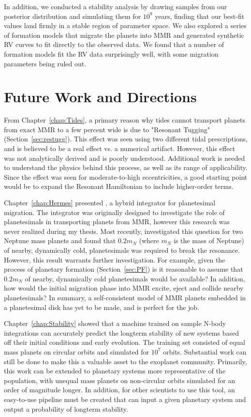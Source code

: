 In addition, we conducted a stability analysis by drawing samples from our posterior distribution and simulating them for $10^9$ years, finding that our best-fit values land firmly in a stable region of parameter space.
We also explored a series of formation models that migrate the planets into MMR and generated synthetic RV curves to fit directly to the observed data. 
We found that a number of formation models fit the RV data surprisingly well, with some migration parameters being ruled out.

\section{Future Work and Directions}
From Chapter~\ref{chap:Tides}, a primary reason why tides cannot transport planets from exact MMR to a few percent wide is due to "Resonant Tugging" (Section~\ref{sec:restugg}).
This effect was seen using two different tidal prescriptions, and is believed to be a real effect vs. a numerical artifact. 
However, this effect was not analytically derived and is poorly understood. 
Additional work is needed to understand the physics behind this process, as well as its range of applicability.
Since the effect was seen for moderate-to-high eccentricities, a good starting point would be to expand the Resonant Hamiltonian to include higher-order terms. 

Chapter~\ref{chap:Hermes} presented \hermes, a hybrid integrator for planetesimal migration. 
The integrator was originally designed to investigate the role of planetesimals in transporting planets from MMR, however this research was never realized during my thesis. 
Most recently, \citet{Chatterjee2015} investigated this question for two Neptune mass planets and found that $0.2m_N$ (where $m_N$ is the mass of Neptune) of nearby, dynamically cold, planetesimals was required to break the resonance. 
However, this result warrants further investigation. 
For example, given the process of planetary formation (Section~\ref{sec:PF}) is it reasonable to assume that $0.2m_N$ of nearby, dynamically cold planetesimals would be available?
In addition, how would the initial migration phase into MMR excite, eject and collide nearby planetesimals?
In summary, a self-consistent model of MMR planets embedded in a planetesimal disk has yet to be made, and \hermes is perfect for the job.

Chapter~\ref{chap:Stability} showed that a machine trained on sample N-body integrations can accurately predict the longterm stability of new systems based off their initial conditions and early evolution. 
The training set consisted of equal mass planets on circular orbits and simulated for $10^7$ orbits. 
Substantial work can still be done to make this a valuable asset to the exoplanet community.
Primarily, this work can be extended to planetary systems more representative of the \kep population, with unequal mass planets on non-circular orbits simulated for an order of magnitude longer. 
In addition, for other scientists to use this tool, an easy-to-use pipeline must be created that can input a given planetary system and output a probability of longterm stability. 

